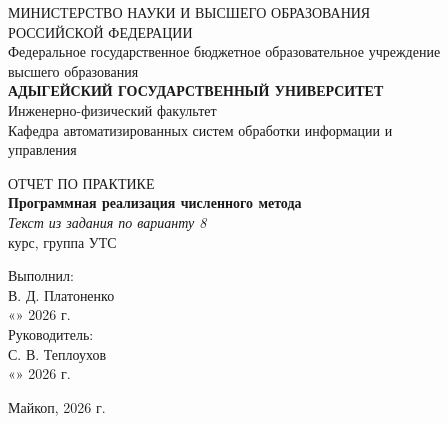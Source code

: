 \documentclass[12pt,a4paper]{article}
\begin{document}
\pagestyle{empty}
\begin{center}
    {\fontsize{12pt}{14pt}\selectfont
        МИНИСТЕРСТВО НАУКИ И ВЫСШЕГО ОБРАЗОВАНИЯ\\
        РОССИЙСКОЙ ФЕДЕРАЦИИ\\
        Федеральное государственное бюджетное образовательное учреждение\\
        высшего образования\\
        \textbf{АДЫГЕЙСКИЙ ГОСУДАРСТВЕННЫЙ УНИВЕРСИТЕТ}\\
    }
    \vspace{0.3cm}
    {\fontsize{12pt}{14pt}\selectfont
        Инженерно-физический факультет\\
        Кафедра автоматизированных систем обработки информации и\\
        управления\\
    }
\end{center}
\vspace{4.5cm}
\begin{center}
    {\fontsize{14pt}{16pt}\selectfont ОТЧЕТ ПО ПРАКТИКЕ\\}
    \vspace{0.5cm}
    {\fontsize{16pt}{18pt}\selectfont \textbf{Программная реализация численного метода}\\}
    {\fontsize{14pt}{16pt}\selectfont \textit{Текст из задания по варианту 8}\\}
    \vspace{0.8cm}
    {\fontsize{12pt}{14pt} курс, группа УТС\\}
\end{center}
\vspace{3cm}
\hfill
\begin{minipage}{0.48\textwidth}
    {\normalsize Выполнил:\\
    \underline{\hspace{3.5cm}} В. Д. Платоненко\\
    «\underline{\hspace{0.8cm}}» \underline{\hspace{2.2cm}} 2026 г.\\
    \vspace{0.6cm}
    Руководитель:\\
    \underline{\hspace{3.5cm}} С. В. Теплоухов\\
    «\underline{\hspace{0.8cm}}» \underline{\hspace{2.2cm}} 2026 г.}
\end{minipage}
\vfill 
\begin{center}
    {\normalsize Майкоп, 2026 г.}
\end{center}
\newpage
\end{document}
